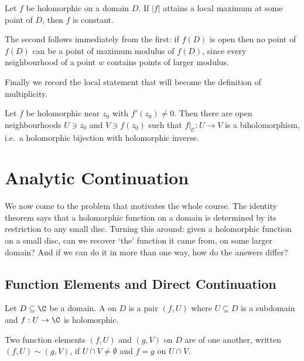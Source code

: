 \begin{theorem}\label{thm:maxmodplane}
	Let $f$ be holomorphic on a domain $D$. If $|f|$ attains a local maximum at some
	point of $D$, then $f$ is constant.
\end{theorem}

The second follows immediately from the first: if $f(D)$ is open then no point of $f(D)$
can be a point of maximum modulus of $f(D)$, since every neighbourhood of a point $w$
contains points of larger modulus.

Finally we record the local statement that will become the definition of multiplicity.

\begin{theorem}\label{thm:ift}
	Let $f$ be holomorphic near $z_0$ with $f'(z_0) \neq 0$. Then there are open
	neighbourhoods $U \ni z_0$ and $V \ni f(z_0)$ such that $f|_U : U \to V$ is a
	biholomorphism, i.e.\ a holomorphic bijection with holomorphic inverse.
\end{theorem}

\section{Analytic Continuation}

We now come to the problem that motivates the whole course. The identity theorem says
that a holomorphic function on a domain is determined by its restriction to any small
disc. Turning this around: given a holomorphic function on a small disc, can we recover
`the' function it came from, on some larger domain? And if we can do it in more than one
way, how do the answers differ?

\subsection{Function Elements and Direct Continuation}

\begin{definition}
	Let $D \subseteq \C$ be a domain. A  on $D$ is a pair
	$(f, U)$ where $U \subseteq D$ is a subdomain and $f : U \to \C$ is holomorphic.
\end{definition}

\begin{definition}
	Two function elements $(f, U)$ and $(g, V)$ on $D$ are  of one another, written $(f, U) \sim (g, V)$, if $U \cap V \neq \emptyset$
	and $f = g$ on $U \cap V$.
\end{definition}

